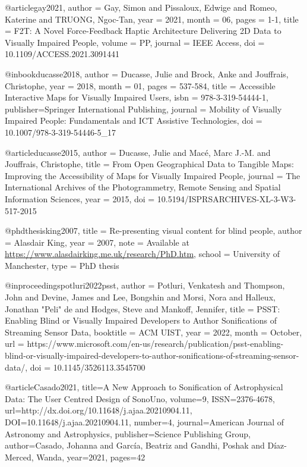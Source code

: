 @article{gay2021,
author = {Gay, Simon and Pissaloux, Edwige and Romeo, Katerine and TRUONG, Ngoc-Tan},
year = {2021},
month = {06},
pages = {1-1},
title = {F2T: A Novel Force-Feedback Haptic Architecture Delivering 2D Data to Visually Impaired People},
volume = {PP},
journal = {IEEE Access},
doi = {10.1109/ACCESS.2021.3091441}
}

@inbook{ducasse2018,
author = {Ducasse, Julie and Brock, Anke and Jouffrais, Christophe},
year = {2018},
month = {01},
pages = {537-584},
title = {Accessible Interactive Maps for Visually Impaired Users},
isbn = {978-3-319-54444-1},
publisher={Springer International Publishing},
journal = {Mobility of Visually Impaired People: Fundamentals and ICT Assistive Technologies},
doi = {10.1007/978-3-319-54446-5_17}
}




@article{ducasse2015,
  author = {Ducasse, Julie and Macé, Marc J.-M. and Jouffrais, Christophe},
  title = {From Open Geographical Data to Tangible Maps: Improving the Accessibility of Maps for Visually Impaired People},
  journal = {The International Archives of the Photogrammetry, Remote Sensing and Spatial Information Sciences},
  year = {2015},
  doi = {10.5194/ISPRSARCHIVES-XL-3-W3-517-2015}
}

@phdthesis{king2007,
  title        = {Re-presenting visual content for blind people},
  author       = {Alasdair King},
  year         = 2007,
  note         = {Available at \url{https://www.alasdairking.me.uk/research/PhD.htm}},
  school       = {University of Manchester},
  type         = {PhD thesis}
}

@inproceedings{potluri2022psst,
author = {Potluri, Venkatesh and Thompson, John and Devine, James and Lee, Bongshin and Morsi, Nora and Halleux, Jonathan "Peli" de and Hodges, Steve and Mankoff, Jennifer},
title = {PSST: Enabling Blind or Visually Impaired Developers to Author Sonifications of Streaming Sensor Data},
booktitle = {ACM UIST},
year = {2022},
month = {October},
url = {https://www.microsoft.com/en-us/research/publication/psst-enabling-blind-or-visually-impaired-developers-to-author-sonifications-of-streaming-sensor-data/},
doi = {10.1145/3526113.3545700}
}


@article{Casado2021,
   title={A New Approach to Sonification of Astrophysical Data: The User Centred Design of SonoUno},
   volume={9},
   ISSN={2376-4678},
   url={http://dx.doi.org/10.11648/j.ajaa.20210904.11},
   DOI={10.11648/j.ajaa.20210904.11},
   number={4},
   journal={American Journal of Astronomy and Astrophysics},
   publisher={Science Publishing Group},
   author={Casado, Johanna and García, Beatriz and Gandhi, Poshak and Díaz-Merced, Wanda},
   year={2021},
   pages={42} }



